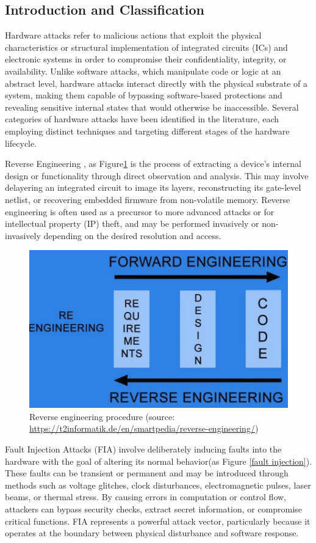 \subsection{Introduction and Classification}
Hardware attacks refer to malicious actions that exploit the physical characteristics or structural implementation of integrated circuits (ICs) and electronic systems in order to compromise their confidentiality, integrity, or availability. Unlike software attacks, which manipulate code or logic at an abstract level, hardware attacks interact directly with the physical substrate of a system, making them capable of bypassing software-based protections and revealing sensitive internal states that would otherwise be inaccessible. Several categories of hardware attacks have been identified in the literature, each employing distinct techniques and targeting different stages of the hardware lifecycle.

Reverse Engineering \cite{varady1997reverse}, as Figure\ref{malicious} is the process of extracting a device’s internal design or functionality through direct observation and analysis. This may involve delayering an integrated circuit to image its layers, reconstructing its gate-level netlist, or recovering embedded firmware from non-volatile memory. Reverse engineering is often used as a precursor to more advanced attacks or for intellectual property (IP) theft, and may be performed invasively or non-invasively depending on the desired resolution and access.

\begin{figure}[t!]
  \centering
  \includegraphics[width=0.5\linewidth]{Chapitre1/figures/reverse.png}
  \caption{Reverse engineering procedure (source: \url{https://t2informatik.de/en/smartpedia/reverse-engineering/})}
  \label{malicious}
\end{figure}

Fault Injection Attacks (FIA) \cite{hsueh1997fault} involve deliberately inducing faults into the hardware with the goal of altering its normal behavior(as Figure \ref{fault injection}). These faults can be transient or permanent and may be introduced through methods such as voltage glitches, clock disturbances, electromagnetic pulses, laser beams, or thermal stress. By causing errors in computation or control flow, attackers can bypass security checks, extract secret information, or compromise critical functions. FIA represents a powerful attack vector, particularly because it operates at the boundary between physical disturbance and software response.


